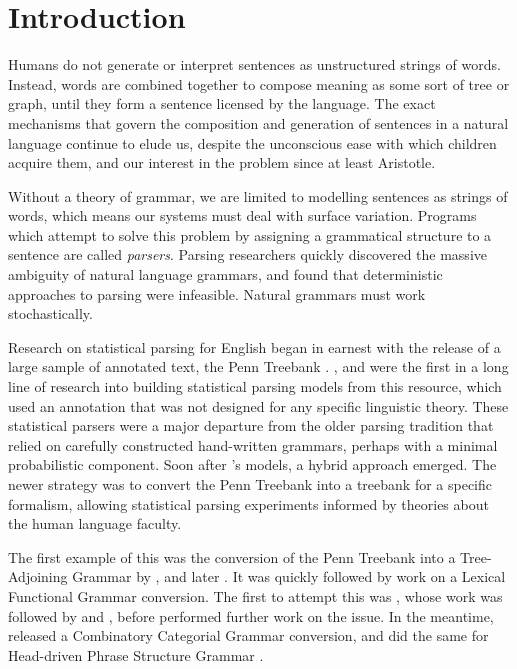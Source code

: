 \chapter{Introduction}

Humans do not generate or interpret sentences as unstructured strings of words.
Instead, words are combined together to compose meaning as some sort of tree or
graph, until they form a sentence licensed by the language. The exact mechanisms
that govern the composition and generation of sentences in a natural language
continue to elude us, despite the unconscious ease with which children acquire
them, and our interest in the problem since at least Aristotle.

Without a theory of grammar, we
are limited to modelling sentences as strings of words, which means our systems
must deal with surface variation. Programs which
attempt to solve this problem by assigning a grammatical structure to a sentence
are called \emph{parsers}. Parsing researchers quickly discovered the
massive ambiguity of natural language grammars, and found that deterministic
approaches to parsing were infeasible. Natural grammars must work stochastically.

Research on statistical parsing for English began in earnest with the release of
a large sample of annotated text, the Penn Treebank \citep{marcus:93}.
\citet{magerman:95}, \citet{collins:96} and \citet{charniak:97} were the first
in a long line of research into building statistical parsing models from this
resource, which used an annotation that was not designed for any specific linguistic
theory.
These statistical parsers were a major departure from
the older parsing tradition that relied on carefully constructed hand-written
grammars, perhaps with a minimal probabilistic component. Soon after
\citeauthor{collins:96}'s models, a hybrid approach emerged. The newer strategy
was to convert the Penn Treebank into a treebank for a specific formalism,
allowing statistical parsing experiments informed by theories about the human
language faculty.

The first example of this was the conversion of the Penn Treebank into a
Tree-Adjoining Grammar \citep[\textsc{tag},][]{joshi:85} by \citet{xia:99},
\citet{xia:00} and later \citet{chen:06}. It was quickly followed by work on
a Lexical Functional Grammar \citep[\lfg,][]{kaplan:82} conversion. The first
to attempt this was \citet{genabith:99}, whose work was followed by \citet{sadler:00}
and \citet{frank:00}, before \citet{cahill:08} performed further work on the
issue.
In the meantime, \citet{hock:thesis03} released a Combinatory Categorial Grammar
\citep[\ccg,][]{steedman:00} conversion, and
\citet{miyao:04} did the same for Head-driven Phrase Structure Grammar
\citep[\hpsg,][]{pollard:94}.

